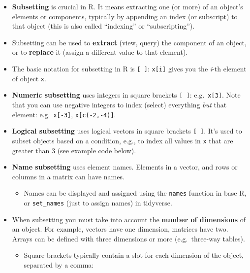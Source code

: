 \documentclass[
]{book}
\providecommand{\tightlist}{%
  \setlength{\itemsep}{0pt}\setlength{\parskip}{0pt}}
\begin{document}
\begin{itemize}
\tightlist
\item
  \textbf{Subsetting} is crucial in R. It means extracting one (or more) of an object's elements or components, typically by appending an index (or subscript) to that object (this is also called ``indexing'' or ``subscripting'').
\item
  Subsetting can be used to \textbf{extract} (view, query) the component of an object, or to \textbf{replace} it (assign a different value to that element).
\item
  The basic notation for subsetting in R is \texttt{{[}\ {]}}: \texttt{x{[}i{]}} gives you the \emph{i}-th element of object \texttt{x}.
\item
  \textbf{Numeric subsetting} uses integers in square brackets \texttt{{[}\ {]}}: e.g.~\texttt{x{[}3{]}}. Note that you can use negative integers to index (select) everything \emph{but} that element: e.g.~\texttt{x{[}-3{]}}, \texttt{x{[}c(-2,-4){]}}.
\item
  \textbf{Logical subsetting} uses logical vectors in square brackets \texttt{{[}\ {]}}. It's used to subset objects based on a condition, e.g., to index all values in \texttt{x} that are greater than 3 (see example code below).
\item
  \textbf{Name subsetting} uses element names. Elements in a vector, and rows or columns in a matrix can have names.

  \begin{itemize}
  \tightlist
  \item
    Names can be displayed and assigned using the \texttt{names} function in base R, or \texttt{set\_names} (just to assign names) in tidyverse.
  \end{itemize}
\item
  When subsetting you must take into account the \textbf{number of dimensions} of an object. For example, vectors have one dimension, matrices have two. Arrays can be defined with three dimensions or more (e.g.~three-way tables).

  \begin{itemize}
  \tightlist
  \item
    Square brackets typically contain a slot for each dimension of the object, separated by a comma:


\end{itemize}
\end{itemize}
\end{document}
